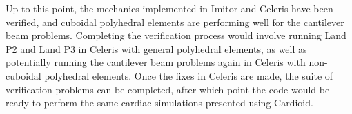 Up to this point, the mechanics implemented in Imitor and Celeris have been verified, and cuboidal polyhedral elements are performing well for the cantilever beam problems. Completing the verification process would involve running Land P2 and Land P3 in Celeris with general polyhedral elements, as well as potentially running the cantilever beam problems again in Celeris with non-cuboidal polyhedral elements. Once the fixes in Celeris are made, the suite of verification problems can be completed, after which point the code would be ready to perform the same cardiac simulations presented using Cardioid.
\vspace{18mm}
\begin{figure}[ht]
\centering
{}		
\subfigure[]{%
}
\end{figure}
